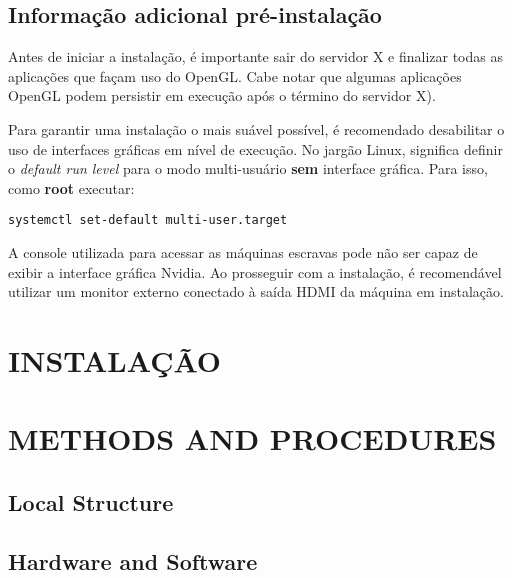 \documentclass[twoside,a4paper,12pt,english]{inac17}
\begin{document}
\subsection{Informação adicional pré-instalação}

Antes de iniciar a instalação, é importante sair do servidor X e 
finalizar todas as aplicações que façam uso do OpenGL. Cabe notar 
que algumas aplicações OpenGL podem persistir em execução após 
o término do servidor X).

Para garantir uma instalação o mais suável possível, é recomendado 
desabilitar o uso de interfaces gráficas em nível de execução. No 
jargão Linux, significa definir o \textit{default run level} para 
o modo multi-usuário \textbf{sem} interface gráfica. Para isso, 
como \textbf{root} executar:

\texttt{systemctl set-default multi-user.target}

\begin{shadedbox}
A console utilizada para acessar as máquinas escravas pode não ser capaz 
de exibir a interface gráfica Nvidia. Ao prosseguir com a instalação, é recomendável 
utilizar um monitor externo conectado à saída HDMI da máquina em instalação.
\end{shadedbox}

\section{INSTALAÇÃO}


\section{METHODS AND PROCEDURES}

\subsection{Local Structure}


\subsection{Hardware and Software}

\end{document}
